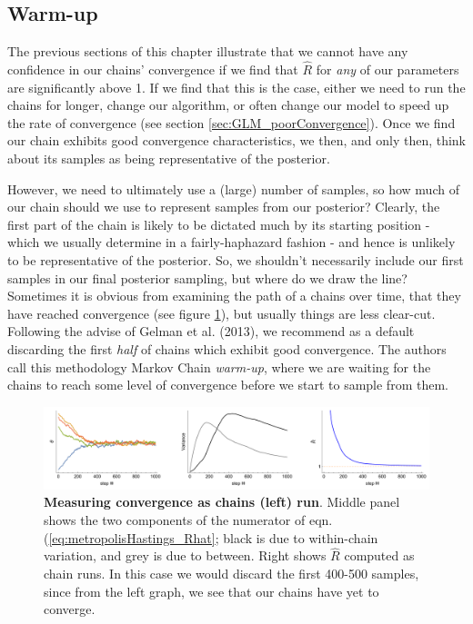 \documentclass[11pt,fullpage]{book}
\begin{document}
\subsection{Warm-up}
The previous sections of this chapter illustrate that we cannot have any confidence in our chains' convergence if we find that $\hat{R}$ for \textit{any} of our parameters are significantly above 1. If we find that this is the case, either we need to run the chains for longer, change our algorithm, or often change our model to speed up the rate of convergence (see section \ref{sec:GLM_poorConvergence}). Once we find our chain exhibits good convergence characteristics, we then, and only then, think about its samples as being representative of the posterior.

However, we need to ultimately use a (large) number of samples, so how much of our chain should we use to represent samples from our posterior? Clearly, the first part of the chain is likely to be dictated much by its starting position - which we usually determine in a fairly-haphazard fashion - and hence is unlikely to be representative of the posterior. So, we shouldn't necessarily include our first samples in our final posterior sampling, but where do we draw the line? Sometimes it is obvious from examining the path of a chains over time, that they have reached convergence (see figure \ref{fig:metropolisHastings_warmUp}), but usually things are less clear-cut. Following the advise of Gelman et al. (2013), we recommend as a default discarding the first \textit{half} of chains which exhibit good convergence. The authors call this methodology Markov Chain \textit{warm-up}, where we are waiting for the chains to reach some level of convergence before we start to sample from them. 

\begin{figure}
\centerline{\includegraphics[width=1\textwidth]{metropolisHastings_warmUp.pdf}}
\caption{\textbf{Measuring convergence as chains (left) run}. Middle panel shows the two components of the numerator of eqn. (\ref{eq:metropolisHastings_Rhat}; black is due to within-chain variation, and grey is due to between. Right shows $\hat{R}$ computed as chain runs. In this case we would discard the first 400-500 samples, since from the left graph, we see that our chains have yet to converge. }\label{fig:metropolisHastings_warmUp}
\end{figure}
\end{document}
